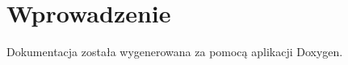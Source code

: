 \hypertarget{index_Wprowadzenie}{}\section{Wprowadzenie}\label{index_Wprowadzenie}
Dokumentacja została wygenerowana za pomocą aplikacji Doxygen. 